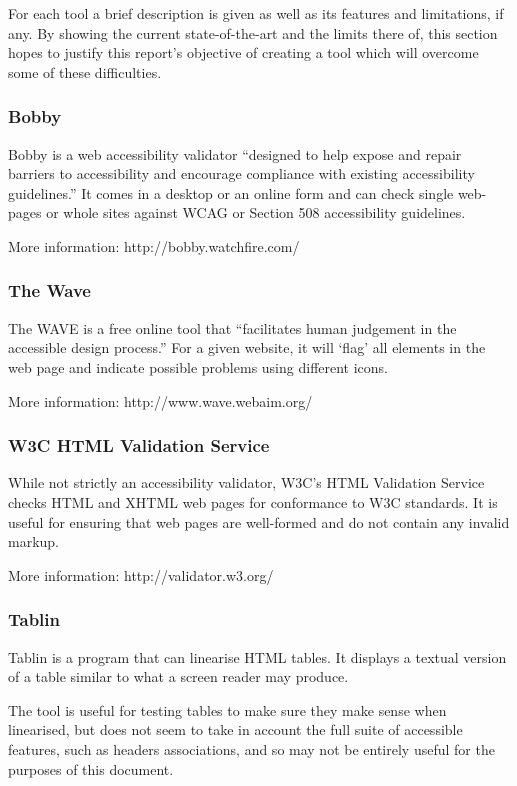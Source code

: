 For each tool a brief description is given as well as its features and
limitations, if any. By showing the current state-of-the-art and the limits
there of, this section hopes to justify this report's objective of creating a
tool which will overcome some of these difficulties.

\subsubsection{Bobby}

Bobby is a web accessibility validator ``designed to help expose and repair
barriers to accessibility and encourage compliance with existing accessibility
guidelines.'' It comes in a desktop or an online form and can check single
web-pages or whole sites against WCAG or Section 508 accessibility guidelines.

More information: http://bobby.watchfire.com/

\subsubsection{The Wave}

The WAVE is a free online tool that ``facilitates human judgement in the
accessible design process.'' For a given website, it will `flag' all elements
in the web page and indicate possible problems using different icons.

More information: http://www.wave.webaim.org/

\subsubsection{W3C HTML Validation Service}

While not strictly an accessibility validator, W3C's HTML Validation Service
checks HTML and XHTML web pages for conformance to W3C standards. It is
useful for ensuring that web pages are well-formed and do not contain
any invalid markup.

More information: http://validator.w3.org/

\subsubsection{Tablin}

Tablin is a program that can linearise HTML tables. It displays a textual
version of a table similar to what a screen reader may produce. 

The tool is useful for testing tables to make sure they make sense when
linearised, but does not seem to take in account the full suite of accessible
features, such as headers associations, and so may not be entirely useful for
the purposes of this document.

